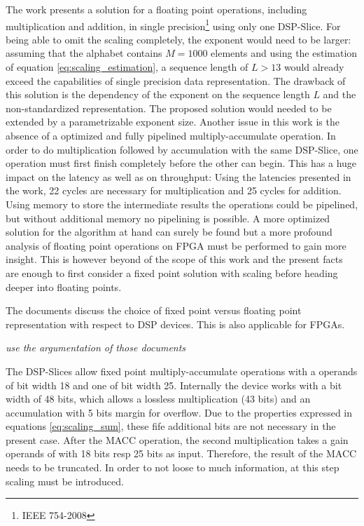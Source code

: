 \documentclass[mscthesis]{usiinfthesis}
\begin{document}
The work \cite{FPL13_Brosser} presents a solution for a floating point
operations, including multiplication and addition, in single
precision\footnote{IEEE 754-2008} using only one DSP-Slice. For being able to
omit the scaling completely, the exponent would need to be larger: assuming
that the alphabet contains $M=1000$ elements and using the estimation of
equation \ref{eq:scaling_estimation}, a sequence length of $L>13$ would already
exceed the capabilities of single precision data representation. The drawback
of this solution is the dependency of the exponent on the sequence length $L$
and the non-standardized representation. The proposed solution would needed to
be extended by a parametrizable exponent size. Another issue in this work is
the absence of a optimized and fully pipelined multiply-accumulate operation.
In order to do multiplication followed by accumulation with the same DSP-Slice,
one operation must first finish completely before the other can begin. This has
a huge impact on the latency as well as on throughput: Using the latencies
presented in the work, 22 cycles are necessary for multiplication and 25 cycles
for addition. Using memory to store the intermediate results the operations
could be pipelined, but without additional memory no pipelining is possible.
A more optimized solution for the algorithm at hand can surely be found but
a more profound analysis of floating point operations on FPGA must be performed
to gain more insight. This is however beyond of the scope of this work and the
present facts are enough to first consider a fixed point solution with scaling
before heading deeper into floating points.

The documents \cite{smith97, ti04} discuss the choice of fixed point versus
floating point representation with respect to DSP devices. This is also
applicable for FPGAs.

\emph{\color{red} use the argumentation of those documents}

The DSP-Slices allow fixed point multiply-accumulate operations with a operands
of bit width 18 and one of bit width 25. Internally the device works with a bit
width of 48 bits, which allows a lossless multiplication (43 bits) and an
accumulation with 5 bits margin for overflow. Due to the properties expressed in
equations \ref{eq:scaling_sum}, these fife additional bits are not necessary in
the present case. After the MACC operation, the second multiplication takes
a gain operands of with 18 bits resp 25 bits as input. Therefore, the result of
the MACC needs to be truncated. In order to not loose to much information, at
this step scaling must be introduced.
\end{document}
